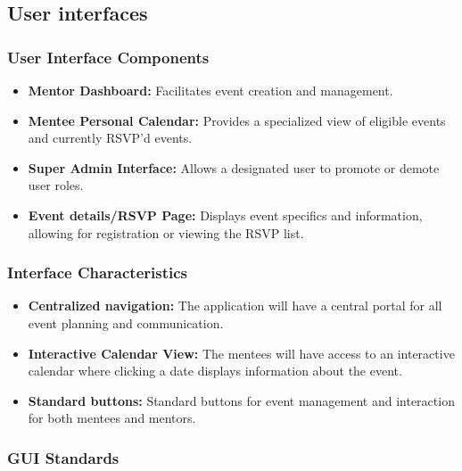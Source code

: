 \subsection{User interfaces}

\subsubsection{User Interface Components}

\begin{itemize}
    \item \textbf{Mentor Dashboard:} Facilitates event creation and management.
    
    \item \textbf{Mentee Personal Calendar:} Provides a specialized view of
    eligible events and currently RSVP'd events.
    
    \item \textbf{Super Admin Interface:} Allows a designated user to promote or
    demote user roles.
    
    \item \textbf{Event details/RSVP Page:} Displays event specifics and
    information, allowing for registration or viewing the RSVP list.
\end{itemize}



\subsubsection{Interface Characteristics}

\begin{itemize}
    \item \textbf{Centralized navigation:} The application will have a central
    portal for all event planning and communication.
    
    \item \textbf{Interactive Calendar View:} The mentees will have access to an
    interactive calendar where clicking a date displays information about the
    event.
    
    \item \textbf{Standard buttons:} Standard buttons for event management and
    interaction for both mentees and mentors.
\end{itemize}



\subsubsection{GUI Standards}

